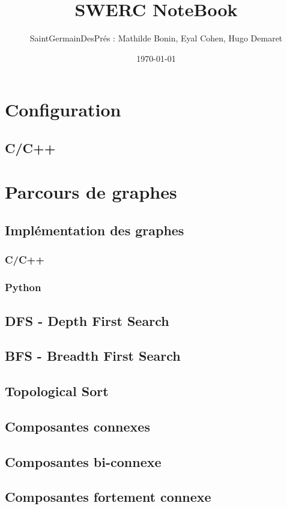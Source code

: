 \documentclass[8pt]{article}
\title{SWERC NoteBook}
\author{SaintGermainDesPrés : Mathilde Bonin, Eyal Cohen, Hugo Demaret}
\date\today
\begin{document}
    \maketitle
    \section{Configuration}
        \subsection{C/C++}
    \section{Parcours de graphes}
        \subsection{Implémentation des graphes}
            \subsubsection{C/C++}
            \subsubsection{Python}
        \subsection{DFS - Depth First Search}
        {\scriptsize}
        \subsection{BFS - Breadth First Search}
        {\scriptsize}
        \subsection{Topological Sort}
        \subsection{Composantes connexes}
        \subsection{Composantes bi-connexe}
        \subsection{Composantes fortement connexe}
\end{document}
